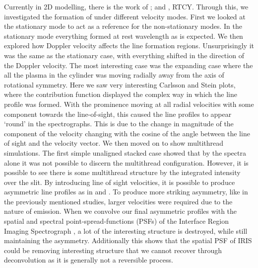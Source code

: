 Currently in 2D modelling, there is the work of \cite{gouttebroze_radiative_2004,gouttebroze_radiative_2005,gouttebroze_radiative_2006,gouttebroze_radiative_2007,gouttebroze_radiative_2008,gouttebroze_radiative_2009}; and \cite{labrosse_radiative_2016}, RTCY. Through this, we investigated the formation of \mgiihk{} under different velocity modes. First we looked at the stationary mode to act as a reference for the non-stationary modes. In the stationary mode everything formed at rest wavelength as is expected. We then explored how Doppler velocity affects the line formation regions. Unsurprisingly it was the same as the stationary case, with everything shifted in the direction of the Doppler velocity. The most interesting case was the expanding case where the all the plasma in the cylinder was moving radially away from the axis of rotational symmetry. Here we saw very interesting Carlsson and Stein plots, where the contribution function displayed the complex way in which the line profile was formed. With the prominence moving at all radial velocities with some component towards the line-of-sight, this caused the line profiles to appear `round' in the spectrographs. This is due to the change in magnitude of the component of the velocity changing with the cosine of the angle between the line of sight and the velocity vector. We then moved on to show multithread simulations. The first simple unaligned stacked case showed that by the spectra alone it was not possible to discern the multithread configuration. However, it is possible to see there is some multithread structure by the integrated intensity over the slit. By introducing line of sight velocities, it is possible to produce asymmetric line profiles as in \cite{gunar_lyman-line_2008} and \cite{labrosse_radiative_2016}. To produce more striking asymmetry, like in the previously mentioned studies, larger velocities were required due to the nature of \mgiihk{} emission. When we convolve our final asymmetric profiles with the spatial and spectral point-spread-functions (PSFs) of the Interface Region Imaging Spectrograph \citep[IRIS; ][]{depontieu_interface_2014}, a lot of the interesting structure is destroyed, while still maintaining the asymmetry. Additionally this shows that the spatial PSF of IRIS could be removing interesting structure that we cannot recover through deconvolution as it is generally not a reversible process. 

